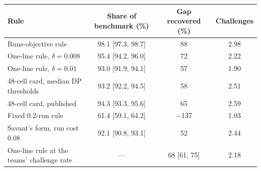 \begin{tabular}{p{4.6cm}ccc}
\toprule
Rule & Share of benchmark (\%) & Gap recovered (\%) & Challenges \\
\midrule
Runs-objective rule \citep{Namuduri2026runs} & 98.1 [97.3, 98.7] & 88 & 2.98 \\
One-line rule, $\delta=0.008$ & 95.4 [94.2, 96.0] & 72 & 2.22 \\
One-line rule, $\delta=0.01$ & 93.0 [91.9, 94.1] & 57 & 1.90 \\
48-cell card, median DP thresholds & 93.2 [92.2, 94.5] & 58 & 2.51 \\
48-cell card, published \citep{Arora2026use} & 94.3 [93.3, 95.6] & 65 & 2.59 \\
Fixed 0.2-run rule \citep{Savant2026abs} & 61.4 [59.1, 64.2] & \ensuremath{-}137 & 1.03 \\
Savant's form, run cost 0.08 & 92.1 [90.8, 93.1] & 52 & 2.44 \\
One-line rule at the teams' challenge rate & --- & 68 [61, 75] & 2.18 \\
\bottomrule
\end{tabular}
